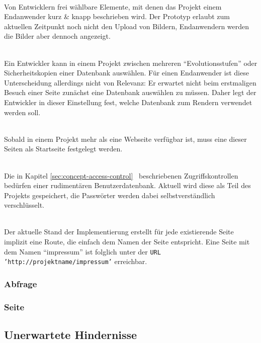 \begin{description}[noitemsep]
\item[Name, Beschreibung \& Bild] \hfill \\
  Von Entwicklern frei wählbare Elemente, mit denen das Projekt einem Endanwender kurz \& knapp beschrieben wird. Der Prototyp erlaubt zum aktuellen Zeitpunkt noch nicht den Upload von Bildern, Endanwendern werden die Bilder aber dennoch angezeigt.
\item[Aktivierte Datenbank] \hfill \\
  Ein Entwickler kann in einem Projekt zwischen mehreren "`Evolutionsstufen"' oder Sicherheitskopien einer Datenbank auswählen. Für einen Endanwender ist diese Unterscheidung allerdings nicht von Relevanz: Er erwartet nicht beim erstmaligen Besuch einer Seite zunächst eine Datenbank auswählen zu müssen. Daher legt der Entwickler in dieser Einstellung fest, welche Datenbank zum Rendern verwendet werden soll.
\item[Startseite] \hfill \\
  Sobald in einem Projekt mehr als eine Webseite verfügbar ist, muss eine dieser Seiten als Startseite festgelegt werden.
\item[Benutzerdatenbank] \hfill \\
  Die in Kapitel \ref{sec:concept-access-control}~ beschriebenen Zugriffskontrollen bedürfen einer rudimentären Benutzerdatenbank. Aktuell wird diese als Teil des Projekts gespeichert, die Passwörter werden dabei selbstverständlich verschlüsselt.
\item[Routendefinitionen (abgeleitet)] \hfill \\
  Der aktuelle Stand der Implementierung erstellt für jede existierende Seite implizit eine Route, die einfach dem Namen der Seite entspricht. Eine Seite mit dem Namen "`impressum"' ist folglich unter der \texttt{URL} \texttt{'http://projektname/impressum'} erreichbar. 
\end{description}

\subsubsection{Abfrage}
\label{sec:data-model-query}

\subsubsection{Seite}

\subsection{Unerwartete Hindernisse}

